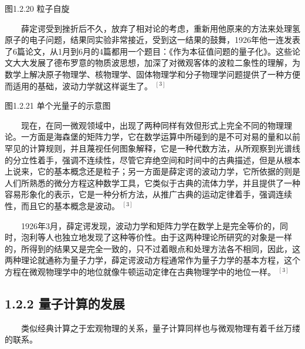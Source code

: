 \documentclass[a4paper,11pt,english]{sphinxmanual}
\begin{document}

\begin{center}图1.2.20 粒子自旋
\end{center}
\sphinxAtStartPar
  薛定谔受到挫折后不久，放弃了相对论的考虑，重新用他原来的方法来处理氢原子的电子问题，结果同实验非常接近，受到这一结果的鼓舞，1926年他一连发表了6篇论文，从1月到6月的4篇都用一个题目：《作为本征值问题的量子化》。这些论文大大发展了德布罗意的物质波思想，加深了对微观客体的波粒二象性的理解，为数学上解决原子物理学、核物理学、固体物理学和分子物理学问题提供了一种方便而适用的基础，波动力学就这样诞生了。 \(^{[3]}\)


\begin{center}图1.2.21 单个光量子的示意图
\end{center}
\sphinxAtStartPar
  现在，在同一微观领域中，出现了两种同样有效但形式上完全不同的物理理论。一方面是海森堡的矩阵力学，它在数学运算中所碰到的是不可对易的量和以前罕见的计算规则，并且蔑视任何图象解释，它是一种代数方法，从所观察到光谱线的分立性着手，强调不连续性，尽管它弃绝空间和时间中的古典描述，但是从根本上说来，它的基本概念还是粒子；另一方面是薛定谔的波动力学，它所依据的则是人们所熟悉的微分方程这种数学工具，它类似于古典的流体力学，并且提供了一种容易形象化的表示，它是一种分析方法，从推广古典的运动定律着手，强调连续性，而且它的基本概念是波动。 \(^{[3]}\)

\sphinxAtStartPar
  1926年3月，薛定谔发现，波动力学和矩阵力学在数学上是完全等价的，同时，泡利等人也独立地发现了这种等价性。由于这两种理论所研究的对象是一样的，所得到的结果又是完全一致的，只不过着眼点和处理方法各不相同，因此，这两种理论就通称为量子力学，薛定谔波动方程通常作为量子力学的基本方程，这个方程在微观物理学中的地位就像牛顿运动定律在古典物理学中的地位一样。 \(^{[3]}\)


\subsection{1.2.2 量子计算的发展}
\label{\detokenize{rst/1.2_u91cf_u5b50_u8ba1_u7b97_u7684_u53d1_u5c55_u5386_u53f2:id3}}
\sphinxAtStartPar
  类似经典计算之于宏观物理的关系，量子计算同样也与微观物理有着千丝万缕的联系。
\end{document}
